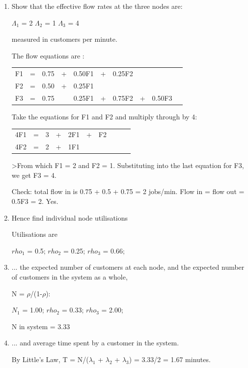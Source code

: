 \documentclass[12pt,fleqn]{report}
\begin{document}
\begin{enumerate}

\item Show that the effective flow rates at the three nodes are:


\begin{center}
$\Lambda_1$ = 2 \hspace*{0.5in} 
$\Lambda_2$ = 1 \hspace*{0.5in} 
$\Lambda_3$ = 4
\end{center}

measured in customers per minute.


The flow equations are :

\begin{tabular}{l c r c r c rc rc}
F1 & = & 0.75 & + & 0.50F1 & +  & 0.25F2 &  & \\
F2 & = & 0.50 & + & 0.25F1 &    &         &  & \\
F3 & = & 0.75 &   & 0.25F1 & +  & 0.75F2 & + & 0.50F3 \\
\end{tabular}

Take the equations for F1 and F2 and multiply through by 4:

\begin{tabular}{l c r c r c rc rc}
4F1 & = & 3 & + & 2F1 & +  & F2 &  & \\
4F2 & = & 2 & + & 1F1 &    &         &  & \\
\end{tabular}

\noindent
>From which F1 = 2 and F2 = 1. 
Substituting into the last equation for F3, we get F3 = 4.

Check: total flow in is 0.75 + 0.5 + 0.75 = 2 jobs/min.
Flow in = flow out = 0.5F3 = 2. Yes.


\item Hence find individual node utilisations 

Utilisations are 

$rho_1$ = 0.5; $rho_2$ = 0.25; $rho_3$ = 0.66; 

\item ... the expected number of customers at each node, and 
the expected number of customers in the system as a whole,

N = $\rho$/(1-$\rho$):


$N_1$ = 1.00; $rho_2$ = 0.33; $rho_3$ = 2.00; 

N in system = 3.33


\item ... and average time spent by a customer in the system.  


By Little's Law, T = N/($\lambda_1$ + $\lambda_2$ + $\lambda_3$) =
3.33/2 = 1.67 minutes.

\end{enumerate}
\end{document}
